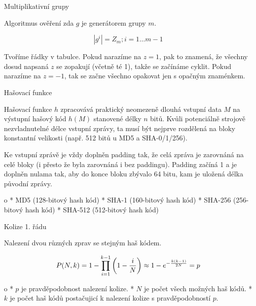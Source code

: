 \sec Multiplikativní grupy

Algoritmus ověření zda $g$ je generátorem grupy $m$.

$$\left|g^i\right| = Z_m; i = 1 \ldots m - 1$$

\noindent
Tvoříme řádky v tabulce. Pokud narazíme na $z = 1$, pak to znamená, že všechny dosud napsaná $z$ se zopakují (včetně té 1), takže se začínáme cyklit. Pokud narazíme na $z = -1$, tak se začne všechno opakovat jen s opačným znaménkem.

\medskip
{}

\chap Hašovací funkce

Hašovací funkce $h$ zpracovává praktický neomezeně dlouhá vstupní data $M$ na výstupní hašový kód $h(M)$ stanovené délky $n$ bitů.
Kvůli potenciálně strojově nezvladnutelné délce vstupní zprávy, ta musí být nejprve rozdělená na bloky konstantní velikosti (např. 512 bitů u MD5 a SHA-0/1/256).

Ke vstupní zprávě je vždy doplněn padding tak, že celá zpráva je zarovnáná na celé bloky (i přesto že byla zarovnáná i bez paddingu). Padding začíná 1 a je doplněn nulama tak, aby do konce bloku zbývalo 64 bitu, kam je uložená délka původní zprávy.

\begitems \style o
* MD5 (128-bitový hash kód)
* SHA-1 (160-bitový hash kód)
* SHA-256 (256-bitový hash kód)
* SHA-512 (512-bitový hash kód)
\enditems



\sec Kolize 1. řádu

Nalezení dvou různých zprav se stejným haš kódem.

$$
P(N,k) = 1 - \prod^{k-1}_{i=1}\left( 1 - {i \over N} \right)
\approx 1 - e^{-{k(k-1) \over 2N}}= p
$$

\begitems \style o
* $p$ je pravděpodobnost nalezení kolize.
* $N$ je počet všech možných haš kódů.
* $k$ je počet haš kódů postačujicí k nalezení kolize s pravděpodobností $p$.
\enditems

